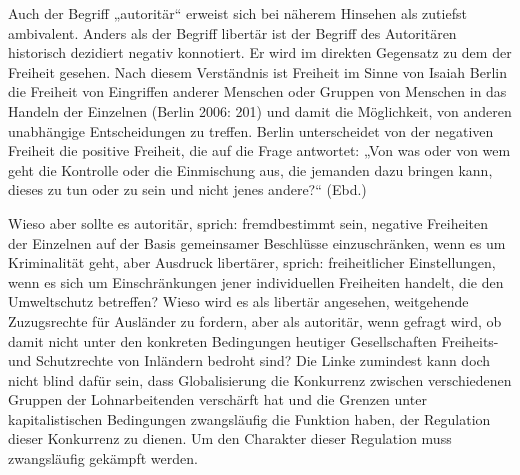 \begin{multicols*}{2}
Auch der Begriff „autoritär“ erweist sich bei näherem Hinsehen als zutiefst ambivalent. Anders als der Begriff libertär ist der Begriff des Autoritären historisch dezidiert negativ konnotiert. Er wird im direkten Gegensatz zu dem der Freiheit gesehen. Nach diesem Verständnis ist Freiheit im Sinne von Isaiah Berlin die Freiheit von Eingriffen anderer Menschen oder Gruppen von Menschen in das Handeln der Einzelnen (Berlin 2006: 201) und damit die Möglichkeit, von anderen unabhängige Entscheidungen zu treffen. Berlin unterscheidet von der negativen Freiheit die positive Freiheit, die auf die Frage antwortet: „Von was oder von wem geht die Kontrolle oder die Einmischung aus, die jemanden dazu bringen kann, dieses zu tun oder zu sein und nicht jenes andere?“ (Ebd.) 

Wieso aber sollte es autoritär, sprich: fremdbestimmt sein, negative Freiheiten der Einzelnen auf der Basis gemeinsamer Beschlüsse einzuschränken, wenn es um Kriminalität geht, aber Ausdruck libertärer, sprich: freiheitlicher Einstellungen, wenn es sich um Einschränkungen jener individuellen Freiheiten handelt, die den Umweltschutz betreffen? Wieso wird es als libertär angesehen, weitgehende Zuzugsrechte für Ausländer zu fordern, aber als autoritär, wenn gefragt wird, ob damit nicht unter den konkreten Bedingungen heutiger Gesellschaften Freiheits- und Schutzrechte von Inländern bedroht sind? Die Linke zumindest kann doch nicht blind dafür sein, dass Globalisierung die Konkurrenz zwischen verschiedenen Gruppen der Lohnarbeitenden verschärft hat und die Grenzen unter kapitalistischen Bedingungen zwangsläufig die Funktion haben, der Regulation dieser Konkurrenz zu dienen. Um den Charakter dieser Regulation muss zwangsläufig gekämpft werden.


\end{multicols*}
